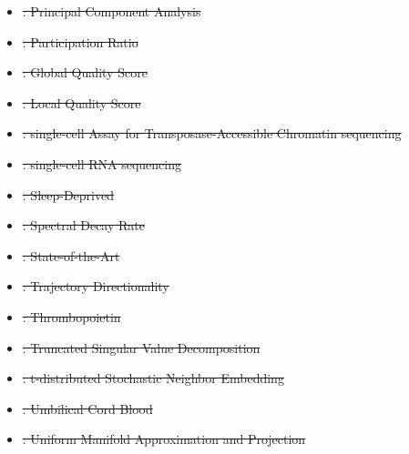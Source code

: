 \documentclass[referee, pdflatex, sn-vancouver-num]{sn-jnl}
\providecommand{\DIFdeltex}[1]{{\protect\color{red}\sout{#1}}}                      %
\providecommand{\DIFdel}[1]{\texorpdfstring{\DIFdeltex{#1}}{}} %
\begin{document}
\begin{appendices}
\begin{itemize}
\item%
\DIFdel{: Principal Component Analysis
    }%
\item%
\DIFdel{: Participation Ratio
    }%
\item%
\DIFdel{: Global Quality Score
    }%
\item%
\DIFdel{: Local Quality Score
    }%
\item%
\DIFdel{: single-cell Assay for Transposase-Accessible Chromatin sequencing
    }%
\item%
\DIFdel{: single-cell RNA sequencing
    }%
\item%
\DIFdel{: Sleep-Deprived
    }%
\item%
\DIFdel{: Spectral Decay Rate
    }%
\item%
\DIFdel{: State-of-the-Art
    }%
\item%
\DIFdel{: Trajectory Directionality
    }%
\item%
\DIFdel{: Thrombopoietin
    }%
\item%
\DIFdel{: Truncated Singular Value Decomposition
    }%
\item%
\DIFdel{: t-distributed Stochastic Neighbor Embedding
    }%
\item%
\DIFdel{: Umbilical Cord Blood
    }%
\item%
\DIFdel{: Uniform Manifold Approximation and Projection
    }%

\end{itemize}
\end{appendices}
\end{document}
